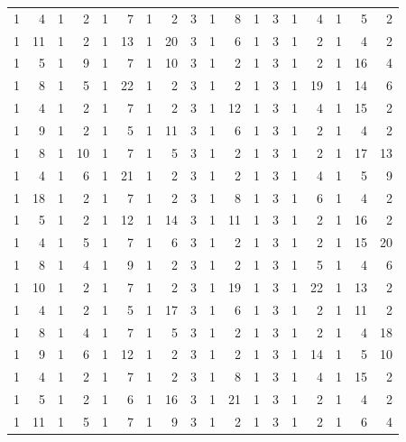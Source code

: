 \documentclass[11pt,reqno]{amsart}
\theoremstyle{plain}
\theoremstyle{plain}
\theoremstyle{plain}
\begin{document}
\begin{center}\footnotesize
\setlength{\tabcolsep}{3pt}
\begin{tabular}{rrrrrrrrrrrrrrrrrr}
 1 &  4 &  1 &  2 &  1 &  7 &  1 &  2 &  3 &  1 &  8 &  1 &  3 &  1 &  4 &  1 &  5 &  2 \\
 1 & 11 &  1 &  2 &  1 & 13 &  1 & 20 &  3 &  1 &  6 &  1 &  3 &  1 &  2 &  1 &  4 &  2 \\
 1 &  5 &  1 &  9 &  1 &  7 &  1 & 10 &  3 &  1 &  2 &  1 &  3 &  1 &  2 &  1 & 16 &  4 \\
 1 &  8 &  1 &  5 &  1 & 22 &  1 &  2 &  3 &  1 &  2 &  1 &  3 &  1 & 19 &  1 & 14 &  6 \\
 1 &  4 &  1 &  2 &  1 &  7 &  1 &  2 &  3 &  1 & 12 &  1 &  3 &  1 &  4 &  1 & 15 &  2 \\
 1 &  9 &  1 &  2 &  1 &  5 &  1 & 11 &  3 &  1 &  6 &  1 &  3 &  1 &  2 &  1 &  4 &  2 \\
 1 &  8 &  1 & 10 &  1 &  7 &  1 &  5 &  3 &  1 &  2 &  1 &  3 &  1 &  2 &  1 & 17 & 13 \\
 1 &  4 &  1 &  6 &  1 & 21 &  1 &  2 &  3 &  1 &  2 &  1 &  3 &  1 &  4 &  1 &  5 &  9 \\
 1 & 18 &  1 &  2 &  1 &  7 &  1 &  2 &  3 &  1 &  8 &  1 &  3 &  1 &  6 &  1 &  4 &  2 \\
 1 &  5 &  1 &  2 &  1 & 12 &  1 & 14 &  3 &  1 & 11 &  1 &  3 &  1 &  2 &  1 & 16 &  2 \\
 1 &  4 &  1 &  5 &  1 &  7 &  1 &  6 &  3 &  1 &  2 &  1 &  3 &  1 &  2 &  1 & 15 & 20 \\
 1 &  8 &  1 &  4 &  1 &  9 &  1 &  2 &  3 &  1 &  2 &  1 &  3 &  1 &  5 &  1 &  4 &  6 \\
 1 & 10 &  1 &  2 &  1 &  7 &  1 &  2 &  3 &  1 & 19 &  1 &  3 &  1 & 22 &  1 & 13 &  2 \\
 1 &  4 &  1 &  2 &  1 &  5 &  1 & 17 &  3 &  1 &  6 &  1 &  3 &  1 &  2 &  1 & 11 &  2 \\
 1 &  8 &  1 &  4 &  1 &  7 &  1 &  5 &  3 &  1 &  2 &  1 &  3 &  1 &  2 &  1 &  4 & 18 \\
 1 &  9 &  1 &  6 &  1 & 12 &  1 &  2 &  3 &  1 &  2 &  1 &  3 &  1 & 14 &  1 &  5 & 10 \\
 1 &  4 &  1 &  2 &  1 &  7 &  1 &  2 &  3 &  1 &  8 &  1 &  3 &  1 &  4 &  1 & 15 &  2 \\
 1 &  5 &  1 &  2 &  1 &  6 &  1 & 16 &  3 &  1 & 21 &  1 &  3 &  1 &  2 &  1 &  4 &  2 \\
 1 & 11 &  1 &  5 &  1 &  7 &  1 &  9 &  3 &  1 &  2 &  1 &  3 &  1 &  2 &  1 &  6 &  4 \\

\end{tabular}
\end{center}
\end{document}
